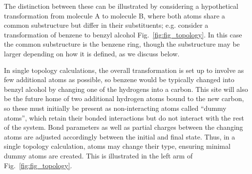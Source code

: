 \documentclass[9pt,bestpractices]{livecoms}
\begin{document}
The distinction between these can be illustrated by considering a hypothetical transformation from molecule A to molecule B, where both atoms share a common substructure but differ in their substituents; e.g. consider a transformation of benzene to benzyl alcohol Fig.~\ref{fig:fig_topology}.
In this case the common substructure is the benzene ring, though the substructure may be larger depending on how it is defined, as we discuss below.

In single topology calculations, the overall transformation is set up to involve as few additional atoms as possible, so benzene would be typically changed into benzyl alcohol by changing one of the hydrogens into a carbon. This site will also be the future home of two additional hydrogen atoms bound to the new carbon, so these must initially be present as non-interacting atoms called ``dummy atoms'', which retain their bonded interactions but do not interact with the rest of the system.  Bond parameters as well as partial charges between the changing atoms are adjusted accordingly between the initial and final state. 
Thus, in a single topology calculation, atoms may change their type, ensuring minimal  dummy atoms are created. This is illustrated in the left arm of Fig.~\ref{fig:fig_topology}. 
\end{document}
